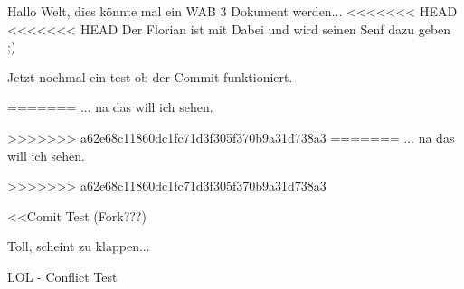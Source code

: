 \documentclass[a4paper,12pt]{scrreprt}
\begin{document}
Hallo Welt, dies könnte mal ein WAB 3 Dokument werden...
<<<<<<< HEAD
<<<<<<< HEAD
Der Florian ist mit Dabei und wird seinen Senf dazu geben ;)

Jetzt nochmal ein test ob der Commit funktioniert.

=======
... na das will ich sehen.

>>>>>>> a62e68c11860dc1fc71d3f305f370b9a31d738a3
=======
... na das will ich sehen.

>>>>>>> a62e68c11860dc1fc71d3f305f370b9a31d738a3

<<Comit Test (Fork???)

Toll, scheint zu klappen...

LOL - Conflict Test
\end{document}
